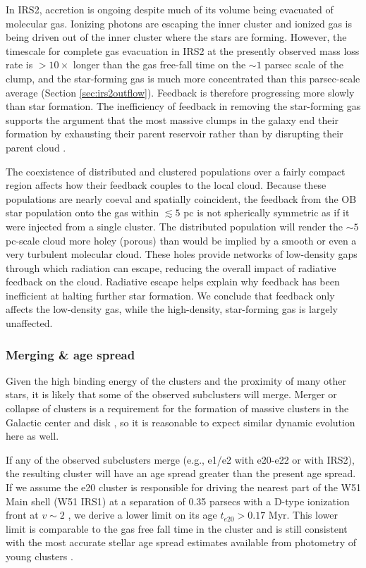 In IRS2, accretion is ongoing despite much of its volume being evacuated of
molecular gas.  Ionizing photons are escaping the inner cluster and ionized gas
is being driven out of the inner cluster where the stars are forming.  However,
the timescale for complete gas evacuation in IRS2 at the presently observed
mass loss rate is ${>}10\times$ longer than the gas free-fall time on the
$\sim1$ parsec scale of the clump, and the star-forming gas is much more
concentrated than this parsec-scale average (Section \ref{sec:irs2outflow}).
Feedback is therefore progressing more slowly than star formation.  The
inefficiency of feedback in removing the star-forming gas supports the argument
that the most massive clumps in the galaxy  end their formation by exhausting
their parent reservoir rather than by disrupting their parent cloud
\citep{Kruijssen2012b,Matzner2015a}.

The coexistence of distributed and clustered populations over a fairly compact
region affects how their feedback couples to the local cloud.  Because these
populations are nearly coeval and spatially coincident, the feedback from the
OB star population onto the gas within $\lesssim5$ pc is not spherically symmetric as
if it were injected from a single cluster.  The distributed population will
render the $\sim5$ pc-scale cloud more holey (porous) than would be
implied by a smooth or even a very turbulent molecular cloud.  These holes
provide networks of low-density gaps through which radiation can escape,
reducing the overall impact of radiative feedback on the cloud.  Radiative
escape helps explain why feedback has been inefficient at halting further star
formation.  We conclude that feedback only affects the low-density gas, while
the high-density, star-forming gas is largely unaffected.

\subsubsection{Merging \& age spread}
\label{sec:merging}
Given the high binding energy of the clusters and the proximity of many other
stars, it is likely that some of the observed subclusters will merge.  Merger
or collapse of clusters is a requirement for the formation of massive
clusters in the Galactic center and disk \citep{Walker2015a,Walker2016a}, so it is reasonable to
expect similar dynamic evolution here as well.

If any of the observed subclusters merge (e.g., e1/e2 with e20-e22 or with
IRS2), the
resulting cluster will have an age spread greater than the present
age spread.  If we assume the e20 cluster is responsible for driving the
nearest part of the W51 Main shell (W51 IRS1) at a separation of 0.35 parsecs with a
D-type ionization front at $v\sim2$ \kms, we derive a lower limit on its age
$t_{e20} > 0.17$ Myr.  This lower limit is comparable to the gas free fall time
in the cluster and is still consistent with the most accurate stellar age
spread estimates available from photometry of young clusters
\citep[e.g.,][]{Kudryavtseva2012a}.


